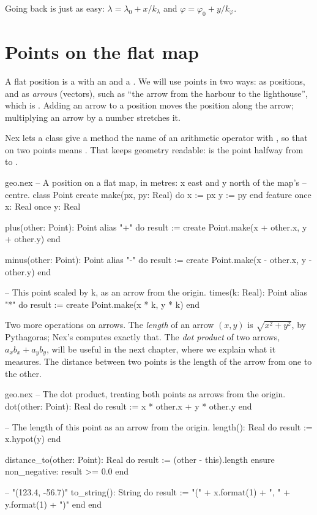 Going back is just as easy: $\lambda = \lambda_0 + x / k_\lambda$ and
$\varphi = \varphi_0 + y / k_\varphi$.

\section{Points on the flat map}

A flat position is a  with an  and a . We will
use points in two ways: as positions, and as \emph{arrows} (vectors), such
as ``the arrow from the harbour to the lighthouse'', which is
. Adding an arrow to a position moves the
position along the arrow; multiplying an arrow by a number stretches it.

Nex lets a class give a method the name of an arithmetic operator with
, so that  on two points means .
That keeps geometry readable:  is the point halfway
from  to .

\begin{append}{geo.nex}
-- A position on a flat map, in metres: x east and y north of the map's
-- centre.
class Point
create
  make(px, py: Real) do
    x := px
    y := py
  end
feature
  once x: Real
  once y: Real

  plus(other: Point): Point alias "+" do
    result := create Point.make(x + other.x, y + other.y)
  end

  minus(other: Point): Point alias "-" do
    result := create Point.make(x - other.x, y - other.y)
  end

  -- This point scaled by k, as an arrow from the origin.
  times(k: Real): Point alias "*" do
    result := create Point.make(x * k, y * k)
  end
\end{append}

Two more operations on arrows. The \emph{length} of an arrow $(x, y)$ is
$\sqrt{x^2 + y^2}$, by Pythagoras; Nex's  computes exactly
that. The \emph{dot product} of two arrows, $a_x b_x + a_y b_y$, will be
useful in the next chapter, where we explain what it measures. The distance
between two points is the length of the arrow from one to the other.

\begin{continued}{geo.nex}
  -- The dot product, treating both points as arrows from the origin.
  dot(other: Point): Real do
    result := x * other.x + y * other.y
  end

  -- The length of this point as an arrow from the origin.
  length(): Real do
    result := x.hypot(y)
  end

  distance_to(other: Point): Real do
    result := (other - this).length
  ensure
    non_negative: result >= 0.0
  end

  -- "(123.4, -56.7)"
  to_string(): String do
    result := "(" + x.format(1) + ", " + y.format(1) + ")"
  end
end
\end{continued}

